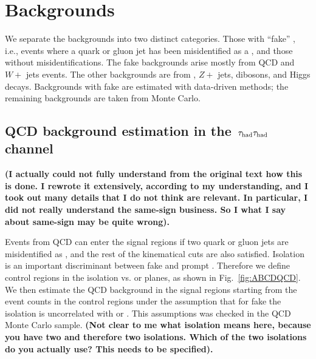 \section{Backgrounds}
\label{sect:bkgLepTau}
We separate the backgrounds into two distinct categories.  Those with 
``fake'' \Tau, i.e., events where a quark or gluon jet has been misidentified
as a \Tau, and those without \Tau misidentifications.  
The fake \Tau backgrounds arise mostly from QCD and $W+$ jets events.  The 
other backgrounds are from \ttbar, $Z+$ jets, dibosons, and Higgs decays.
Backgrounds with fake \Tau are estimated with data-driven methods; the 
remaining backgrounds are taken from Monte Carlo.


\subsection{\texorpdfstring{QCD background estimation in the $\,\tau_{\rm had}\tau_{\rm had}$ channel}{QCD background estimation in the tau-tau channel}}
{\bf (I actually could not fully understand from the original text how this is done.
I rewrote it extensively, according to my understanding, and I took out
many details that I do  not think are relevant.  In particular, I 
did not really understand the same-sign business.
So I what I say about same-sign may be quite wrong).}

Events from QCD can enter the signal regions if two quark or gluon jets are 
misidentified as \Tau, and the rest of the kinematical cuts are also 
satisfied.  Isolation is an important 
discriminant between fake \Tau and prompt \Tau.
Therefore we define control regions in the 
\Tau isolation vs. \mttwo or \SumMT 
planes, as shown in Fig.~\ref{fig:ABCDQCD}. We then estimate the QCD background
in the signal regions starting from the event counts in the
control regions under the assumption
that for fake \Tau the isolation is uncorrelated with \mttwo or \SumMT.
This assumptions was checked in the QCD Monte Carlo sample.
{\bf (Not clear to me what isolation means here, because
you have two \Tau and therefore two isolations.  Which of the 
two isolations do you actually use?  This needs to be specified).}

